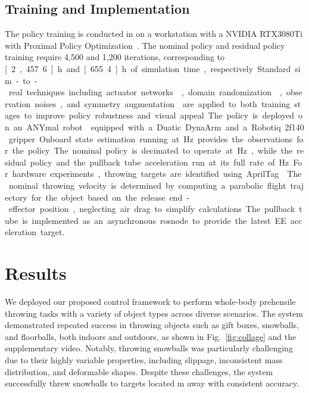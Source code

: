 \documentclass[letterpaper, 10 pt, conference]{ieeeconf} %
\begin{document}
\subsection{Training and Implementation}

The policy training is conducted in \cite{rudin2022learning} on a workstation with a NVIDIA RTX3080Ti with Proximal Policy Optimization~\cite{schulman2017proximal}. The nominal policy and residual policy training require 4,500 and 1,200 iterations, corresponding to \unit[2,457.6]{h} and \unit[655.4]{h} of simulation time, respectively.  Standard sim-to-real techniques including actuator networks~\cite{hwangbo2019learning}, domain randomization~\cite{tobin2017domain}, observation noises, and symmetry augmentation~\cite{mittal2024symmetry} are applied to both training stages to improve policy robustness and visual appeal.

The policy is deployed on an ANYmal robot \cite{hutter2016anymal} equipped with a Duatic DynaArm and a Robotiq 2f140 gripper. Onboard state estimation running at \unit[400]{Hz} provides the observations for the policy. The nominal policy is decimated to operate at \unit[100]{Hz}, while the residual policy and the pullback tube acceleration run at its full rate of \unit[400]{Hz}.

For hardware experiments, throwing targets are identified using AprilTag \cite{olson2011apriltag}. The nominal throwing velocity is determined by computing a parabolic flight trajectory for the object based on the release end-effector position, neglecting air drag to simplify calculations. The pullback tube is implemented as an asynchronous rosnode to provide the latest EE acceleration target.

\section{Results}

We deployed our proposed control framework to perform whole-body prehensile throwing tasks with a variety of object types across diverse scenarios. The system demonstrated repeated success in throwing objects such as gift boxes, snowballs, and floorballs, both indoors and outdoors, as shown in Fig.~\ref{fig:collage} and the supplementary video. Notably, throwing snowballs was particularly challenging due to their highly variable properties, including slippage, inconsistent mass distribution, and deformable shapes. Despite these challenges, the system successfully threw snowballs to targets located \unit[5-7]{m} away with consistent accuracy.
\end{document}
